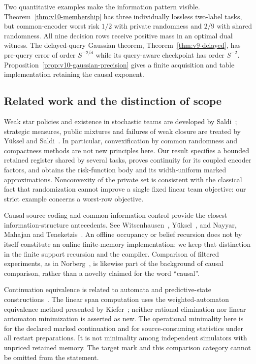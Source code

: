 Two quantitative examples make the information pattern visible.
Theorem~\ref{thm:v10-membership} has three individually lossless
two-label tasks, but common-encoder worst risk $1/2$ with private
randomness and $2/9$ with shared randomness. All nine decision rows
receive positive mass in an optimal dual witness. The delayed-query
Gaussian theorem, Theorem~\ref{thm:v9-delayed}, has pre-query error
of order $S^{-2/d}$ while its query-aware checkpoint has order
$S^{-2}$. Proposition~\ref{prop:v10-gaussian-precision} gives a finite
acquisition and table implementation retaining the causal exponent.

\subsection{Related work and the distinction of scope}
Weak star policies and existence in stochastic teams are developed by
Saldi~\cite{Saldi2017Topology}; strategic measures, public mixtures and
failures of weak closure are treated by Y\"uksel and
Saldi~\cite{YukselSaldi2017}. In particular, convexification by common
randomness and compactness methods are not new principles here. Our
result specifies a bounded retained register shared by several tasks,
proves continuity for its coupled encoder factors, and obtains the
risk-function body and its width-uniform marked approximations.
Nonconvexity of the private set is consistent with the classical fact
that randomization cannot improve a single fixed linear team objective:
our strict example concerns a worst-row objective.

Causal source coding and common-information control provide the
closest information-structure antecedents. See
Witsenhausen~\cite{Witsenhausen1979},
Y\"uksel~\cite{YukselCausal2010}, and
Nayyar, Mahajan and Teneketzis~\cite{NayyarMahajanTeneketzis2013}.
An offline occupancy or belief recursion does not by itself constitute
an online finite-memory implementation; we keep that distinction in
the finite support recursion and the compiler. Comparison of filtered
experiments, as in Norberg~\cite{Norberg2002}, is likewise part of the
background of causal comparison, rather than a novelty claimed for
the word ``causal''.

Continuation equivalence is related to automata and predictive-state
constructions~\cite{Nerode1958,ShaliziCrutchfield2001}. The linear
span computation uses the weighted-automaton equivalence method
presented by Kiefer~\cite{Kiefer2020}; neither rational elimination nor
linear automaton minimization is asserted as new. The operational
minimality here is for the declared marked continuation and for
source-consuming statistics under all restart preparations. It is not
minimality among independent simulators with unpriced retained
memory. The target mark and this comparison category cannot be
omitted from the statement.

